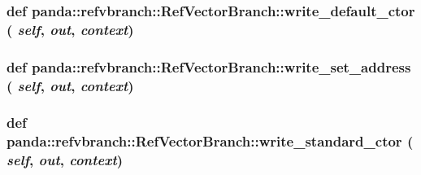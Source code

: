 \label{classpanda_1_1refvbranch_1_1RefVectorBranch_a8d1f936c35c293b5b0b8d1fdf19b4594}
\hypertarget{classpanda_1_1refvbranch_1_1RefVectorBranch_a0e04a132b9ac6ed82fa5d64a6067385a}{
\subsubsection[{write\_\-default\_\-ctor}]{\setlength{\rightskip}{0pt plus 5cm}def panda::refvbranch::RefVectorBranch::write\_\-default\_\-ctor ( {\em self}, \/   {\em out}, \/   {\em context})}}
\label{classpanda_1_1refvbranch_1_1RefVectorBranch_a0e04a132b9ac6ed82fa5d64a6067385a}
\hypertarget{classpanda_1_1refvbranch_1_1RefVectorBranch_aceefab38bff3bb51a1c19ee337ee85a3}{
\subsubsection[{write\_\-set\_\-address}]{\setlength{\rightskip}{0pt plus 5cm}def panda::refvbranch::RefVectorBranch::write\_\-set\_\-address ( {\em self}, \/   {\em out}, \/   {\em context})}}
\label{classpanda_1_1refvbranch_1_1RefVectorBranch_aceefab38bff3bb51a1c19ee337ee85a3}
\hypertarget{classpanda_1_1refvbranch_1_1RefVectorBranch_ac40b5ad9dc346749a358a5c62573fac2}{
\subsubsection[{write\_\-standard\_\-ctor}]{\setlength{\rightskip}{0pt plus 5cm}def panda::refvbranch::RefVectorBranch::write\_\-standard\_\-ctor ( {\em self}, \/   {\em out}, \/   {\em context})}}
\label{classpanda_1_1refvbranch_1_1RefVectorBranch_ac40b5ad9dc346749a358a5c62573fac2}


